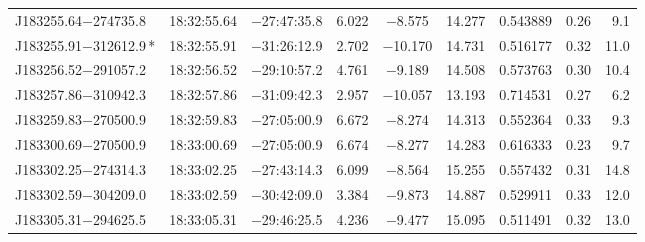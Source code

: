 \begin{table*}
\begin{tabular}{lcccccccr}
J183255.64$-$274735.8 & 18:32:55.64 & $-$27:47:35.8 &  6.022 & $-$8.575 & 14.277 & 0.543889 & 0.26 & 9.1 \\
J183255.91$-$312612.9\,* & 18:32:55.91 & $-$31:26:12.9 &  2.702 & $-$10.170 & 14.731 & 0.516177 & 0.32 & 11.0 \\
J183256.52$-$291057.2 & 18:32:56.52 & $-$29:10:57.2 &  4.761 & $-$9.189 & 14.508 & 0.573763 & 0.30 & 10.4 \\
J183257.86$-$310942.3 & 18:32:57.86 & $-$31:09:42.3 &  2.957 & $-$10.057 & 13.193 & 0.714531 & 0.27 & 6.2 \\
J183259.83$-$270500.9 & 18:32:59.83 & $-$27:05:00.9 &  6.672 & $-$8.274 & 14.313 & 0.552364 & 0.33 & 9.3 \\
J183300.69$-$270500.9 & 18:33:00.69 & $-$27:05:00.9 &  6.674 & $-$8.277 & 14.283 & 0.616333 & 0.23 & 9.7 \\
J183302.25$-$274314.3 & 18:33:02.25 & $-$27:43:14.3 &  6.099 & $-$8.564 & 15.255 & 0.557432 & 0.31 & 14.8 \\
J183302.59$-$304209.0 & 18:33:02.59 & $-$30:42:09.0 &  3.384 & $-$9.873 & 14.887 & 0.529911 & 0.33 & 12.0 \\
J183305.31$-$294625.5 & 18:33:05.31 & $-$29:46:25.5 &  4.236 & $-$9.477 & 15.095 & 0.511491 & 0.32 & 13.0 \\
\hline
\end{tabular}
\end{table*}

\addtocounter{table}{-1}

